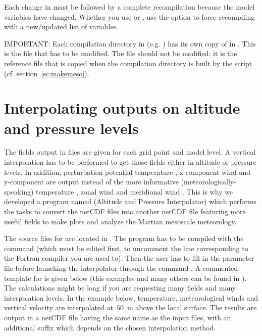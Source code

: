 \sk
Each change in  must be followed by a complete recompilation because the model variables have changed. Whether you use  or , use the option  to force recompiling with a new/updated list of variables.

\sk
\begin{finger}
\item IMPORTANT: Each compilation directory  in  (e.g. ) has its own copy of  in . This is the file that has to be modified. The file  should not be modified: it is the reference file that is copied when the compilation directory is built by the  script (cf. section~\ref{sc:makemeso}).
\end{finger}

\mk
\section{Interpolating outputs on altitude and pressure levels}

\sk
The fields output in  files are given for each grid point and model level. A vertical interpolation has to be performed to get those fields either in altitude or pressure levels. In addition, perturbation potential temperature , x-component wind  and y-component  are output instead of the more informative (meteorologically-speaking) temperature , zonal wind  and meridional wind . This is why we developed a program named  (Altitude and Pressure Interpolator) which performs the tasks to convert the netCDF  files into another netCDF file featuring more useful fields to make plots and analyze the Martian mesoscale meteorology.

\sk
The source files for  are located in . The program  has to be compiled with the  command (which must be edited first, to uncomment the line corresponding to the Fortran compiler you are used to). Then the user has to fill in the parameter file  before launching the interpolator through the command . A commented template for  is given below (this examples and many others can be found in ). The calculations might be long if you are requesting many fields and many interpolation levels. In the example below, temperature, meteorological winds and vertical velocity are interpolated at~$50$~m above the local surface. The results are output in a netCDF file having the same name as the input  files, with an additional suffix which depends on the chosen interpolation method.

